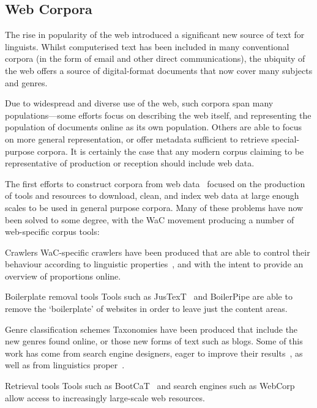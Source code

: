 
\subsection{Web Corpora}
The rise in popularity of the web introduced a significant new source of text for linguists.  Whilst computerised text has been included in many conventional corpora (in the form of email and other direct communications), the ubiquity of the web offers a source of digital-format documents that now cover many subjects and genres.

Due to widespread and diverse use of the web, such corpora span many populations---some efforts focus on describing the web itself, and representing the population of documents online as its own population.  Others are able to focus on more general representation, or offer metadata sufficient to retrieve special-purpose corpora.  It is certainly the case that any modern corpus claiming to be representative of production or reception should include web data.

The first efforts to construct corpora from web data~\cite{kilgarriff2001web} focused on the production of tools and resources to download, clean, and index web data at large enough scales to be used in general purpose corpora.  Many of these problems have now been solved to some degree, with the WaC movement producing a number of web-specific corpus tools:

\begin{itemizeTitle}
    
    \item[Crawlers] WaC-specific crawlers have been produced that are able to control their behaviour according to linguistic properties~\cite{schafer2014focused}, and with the intent to provide an overview of proportions online.

    \item[Boilerplate removal tools] Tools such as JusTexT~\cite{pomikalek2013justext} and BoilerPipe are able to remove the `boilerplate' of websites in order to leave just the content areas.

    \item[Genre classification schemes] Taxonomies have been produced that include the new genres found online, or those new forms of text such as blogs.  Some of this work has come from search engine designers, eager to improve their results~\cite{genreclassification2004}, as well as from linguistics proper~\cite{sharoff2007classifying,santini10genreintro,sharoffs2015}.

    \item[Retrieval tools] Tools such as BootCaT~\cite{baroni2004bootcat} and search engines such as WebCorp~\cite{renouf2003webcorp} allow access to increasingly large-scale web resources.

\end{itemizeTitle}

